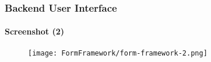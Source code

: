 \begin{frame}[fragile]
	\frametitle{Backend User Interface}
	\framesubtitle{Screenshot (2)}

	\begin{figure}
		\texttt{[image: FormFramework/form-framework-2.png]}
	\end{figure}

\end{frame}

